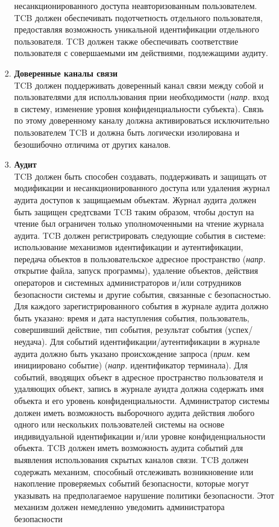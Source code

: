 \begin{enumerate}
\begin{enumerate}
\begin{enumerate}
			несанкционированного доступа неавторизованным пользователем. TCB должен обеспечивать подотчетность отдельного пользователя, предоставляя возможность уникальной идентификации отдельного
			пользователя. TCB должен также обеспечивать соответствие пользователя с совершаемыми им действиями, подлежащими аудиту.
			\item{\textbf{Доверенные каналы	связи}}\\
			TCB должен поддерживать доверенный канал связи между собой и пользователями для исполльзования прии необходимости (\textit{напр.} вход в систему, изменение уровня конфиденциальности
			субъекта). Связь по этому доверенному каналу должна активироваться исключительно пользователем TCB и должна быть логически изолирована и безошибочно отличима от других каналов.
			\item{\textbf{Аудит}}\\
			TCB должен быть способен создавать, поддерживать и защищать от модификации и несанкционированного доступа или удаления журнал аудита доступов к защищаемым объектам. Журнал аудита 
			должен быть защищен средтсвами TCB таким образом, чтобы доступ на чтение был ограничен только уполномоченными на чтение журнала аудита. TCB должен регистрировать следующие события
			в системе: использование механизмов идентификации и аутентификации, передача объектов в пользовательское адресное пространство (\textit{напр.} открытие файла, запуск программы),
			удаление объектов, действия операторов и системных администраторов и/или сотрудников безопасности системы и другие события, связанные с безопасностью. Для каждого зарегистрированного
			события в журнале аудита должно быть указано: время и дата наступления события, пользователь, совершивший действие, тип события, результат события (успех/неудача). Для событий
			идентификации/аутентификации в журнале аудита должно быть указано происхождение запроса (\textit{прим.} кем инициировано событие) (\textit{напр.} идентификатор терминала). Для событий,
			вводящих объект в адресное пространство пользователя и удаляющих объект, запись в журнале ауидта должна содержать имя объекта и его уровень конфиденциальности. Администратор 
			системы должен иметь возможность выборочного аудита действия любого одного или нескольких пользователей системы на основе индивидуальной идентификации и/или уровне конфиденциальности объекта.
			TCB должен иметь возможность аудита событий для выявления использования скрытых каналов связи. TCB должен содержать механизм, способный отслеживать возникновение или накопление 
			проверяемых событий безопасности, которые могут указывать на предполагаемое нарушение политики безопасности. Этот механизм должен немедленно уведомить администратора безопасности 

\end{enumerate}
\end{enumerate}
\end{enumerate}

